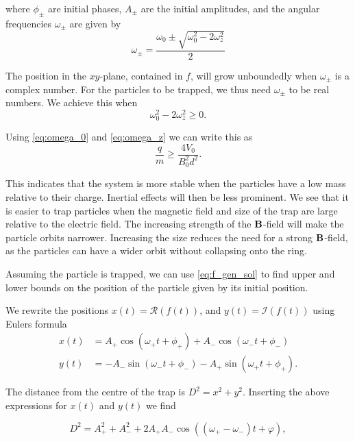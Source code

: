 where $\phi_{\pm}$ are initial phases,  $A_{\pm}$ are the initial amplitudes,
and the angular frequencies $\omega_{\pm}$ are given by
\begin{equation}
\omega_\pm = \frac{\omega_0 \pm \sqrt{\omega_0^2 - 2\omega_z^2}}{2}
\label{eq:omega_pm}
\end{equation}

The position in the $xy$-plane, contained in $f$, will grow unboundedly when $\omega_{\pm}$ is a
complex number.
For the particles to be trapped, we thus need $\omega_{\pm}$ to be real numbers. We achieve this when
\begin{equation}
\omega_0^2 - 2\omega_z^2 \geq 0.
\end{equation}

Using \autoref{eq:omega_0} and \autoref{eq:omega_z} we can write this as
\begin{equation}
\frac{q}{m} \geq \frac{4V_0}{B_0^2d^2}.
\end{equation}

This indicates that the system is more stable when the particles have a low mass relative to their charge.
Inertial effects will then be less prominent. We see that it is easier to trap particles when the magnetic
field and size of the trap are large relative to the electric field. The increasing strength of the $\bold{B}$-field
will make the particle orbits narrower. Increasing the size reduces the need for a strong $\bold{B}$-field,
as the particles can have a wider orbit without collapsing onto the ring.

Assuming the particle is trapped, we can use \autoref{eq:f_gen_sol} to find upper and lower bounds on the
position of the particle given by its initial position.

We rewrite the positions $x(t) = \mathcal{R}(f(t))$, and $y(t) = \mathcal{I}(f(t))$ using Eulers formula
\begin{align}
x(t) &= A_+ \cos(\omega_+t + \phi_+) + A_- \cos(\omega_-t + \phi_-) \\
y(t) &= -A_- \sin(\omega_- t + \phi_-) -A_+ \sin(\omega_+ t + \phi_+).
\end{align}

The distance from the centre of the trap is $D^2 = x^2 + y^2$. Inserting the above expressions for
$x(t)$ and $y(t)$ we find

\begin{equation}
D^2 = A_+^2 + A_-^2 + 2A_+A_-\cos((\omega_+ - \omega_-)t + \varphi),
\end{equation}

